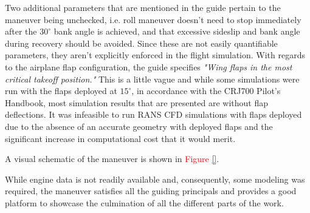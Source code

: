 Two additional parameters that are mentioned in the guide pertain to the maneuver being unchecked, i.e. roll maneuver doesn't need to stop immediately after the $30 ^\circ$ bank angle is achieved, and that excessive sideslip and bank angle during recovery should be avoided.
Since these are not easily quantifiable parameters, they aren't explicitly enforced in the flight simulation.
With regards to the airplane flap configuration, the guide specifies \textit{"Wing flaps in the most critical takeoff position."}
This is a little vague and while some simulations were run with the flaps deployed at $15^\circ$, in accordance with the CRJ700 Pilot's Handbook, most simulation results that are presented are without flap deflections. 
It was infeasible to run RANS CFD simulations with flaps deployed due to the absence of an accurate geometry with deployed flaps and the significant increase in computational cost that it would merit.  

A visual schematic of the maneuver is shown in \textcolor{red}{Figure \ref{}}.

While engine data is not readily available and, consequently, some modeling was required, the maneuver satisfies all the guiding principals and provides a good platform to showcase the culmination of all the different parts of the work.

